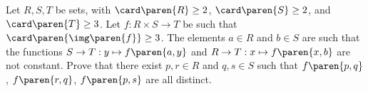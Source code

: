 Let $R, S, T$ be sets, with $\card\paren{R} \geq 2$, $\card\paren{S} \geq 2$, and $\card\paren{T} \geq 3$.
Let $f : R \times S \to T$ be such that $\card\paren{\img\paren{f}} \geq 3$.
The elements $a \in R$ and $b \in S$ are such that the functions
$S \to T : y \mapsto f\paren{a, y}$ and
$R \to T : x \mapsto f\paren{x, b}$
are not constant.\newline
Prove that there exist $p, r \in R$ and $q, s \in S$ such that
$f\paren{p, q}$, $f\paren{r, q}$, $f\paren{p, s}$ are all distinct.
%
